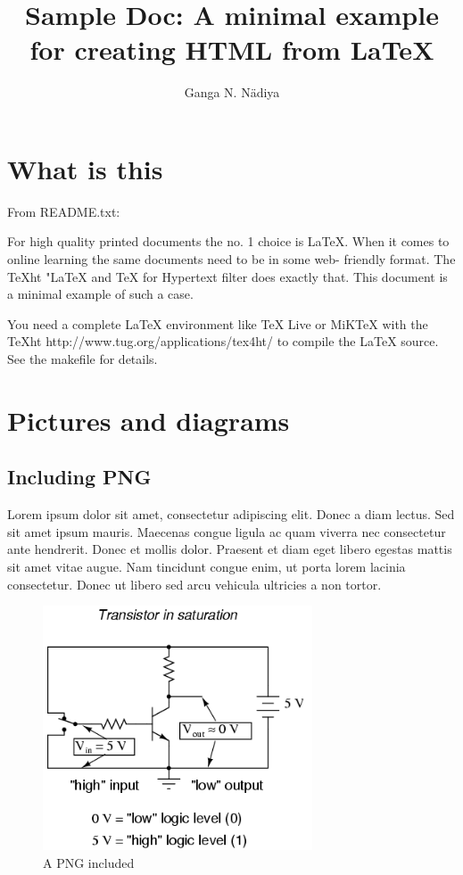 \documentclass[11pt,a4paper,twoside]{article}
\begin{document}
\title{Sample Doc: A minimal example for creating HTML from LaTeX}

\author{Ganga N. N\"adiya}

\thispagestyle{empty}
\maketitle

\setcounter{tocdepth}{1}
\tableofcontents

\section{What is this}

From README.txt:

For high quality printed documents the no. 1 choice is LaTeX.  When it 
comes to online learning the same documents need to be in some web-
friendly format. The TeXht "LaTeX and TeX for Hypertext filter does 
exactly that. This document is a minimal example of such a case.

You need a complete LaTeX environment like TeX Live or MiKTeX with the
TeXht http://www.tug.org/applications/tex4ht/ to compile the LaTeX 
source. See the makefile for details.

\section{Pictures and diagrams}

\subsection{Including PNG}
Lorem ipsum dolor sit amet, consectetur adipiscing elit. Donec a diam
lectus. Sed sit amet ipsum mauris. Maecenas congue ligula ac quam
viverra nec consectetur ante hendrerit. Donec et mollis dolor. Praesent
et diam eget libero egestas mattis sit amet vitae augue. Nam tincidunt
congue enim, ut porta lorem lacinia consectetur. Donec ut libero sed
arcu vehicula ultricies a non tortor. 

\begin{figure}[htb]
  \begin{center}
    \includegraphics[width=80mm]{images/04068}
    \caption{A PNG included}
  \end{center}
\end{figure}
\end{document}
